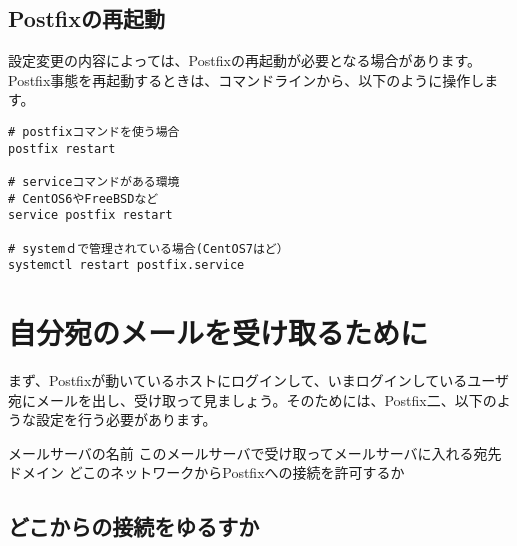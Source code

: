 \subsection{Postfixの再起動}
設定変更の内容によっては、Postfixの再起動が必要となる場合があります。Postfix事態を再起動するときは、コマンドラインから、以下のように操作します。

\begin{lstlisting}[basicstyle=\ttfamily\footnotesize, frame=single]
# postfixコマンドを使う場合
postfix restart

# serviceコマンドがある環境
# CentOS6やFreeBSDなど
service postfix restart

# systemｄで管理されている場合(CentOS7はど）
systemctl restart postfix.service
\end{lstlisting}

\section{自分宛のメールを受け取るために}

まず、Postfixが動いているホストにログインして、いまログインしているユーザ宛にメールを出し、受け取って見ましょう。そのためには、Postfix二、以下のような設定を行う必要があります。

メールサーバの名前
このメールサーバで受け取ってメールサーバに入れる宛先ドメイン
どこのネットワークからPostfixへの接続を許可するか

\subsection{どこからの接続をゆるすか}
